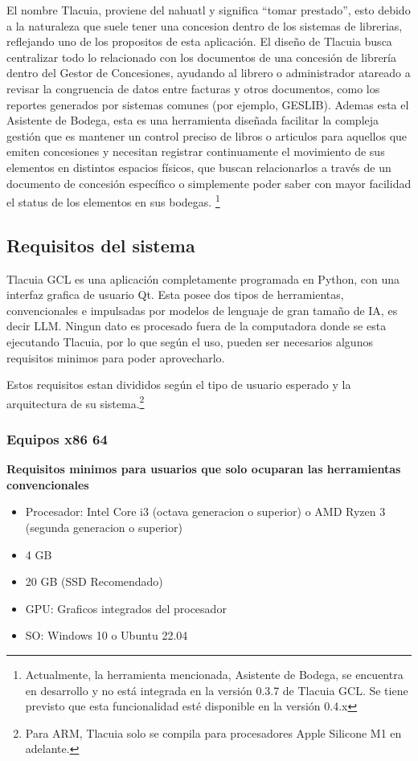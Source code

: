 \documentclass[12pt, letterpaper]{article}
\begin{document}
El nombre Tlacuia, proviene del nahuatl y significa “tomar prestado”, esto debido a la naturaleza que suele tener una concesion 
dentro de los sistemas de librerias, reflejando uno de los propositos de esta aplicación. El diseño de Tlacuia busca centralizar 
todo lo relacionado con los documentos de una concesión de librería dentro del Gestor de Concesiones, ayudando al librero o 
administrador atareado a revisar la congruencia de datos entre facturas y otros documentos, como los reportes generados por 
sistemas comunes (por ejemplo, GESLIB). Ademas esta el Asistente de Bodega, esta es una herramienta diseñada facilitar la compleja 
gestión que es mantener un control preciso de libros o articulos para aquellos que emiten concesiones y necesitan registrar 
continuamente el movimiento de sus elementos en distintos espacios físicos, que buscan relacionarlos a través de un documento 
de concesión específico o simplemente poder saber con mayor facilidad el status de los elementos en sus bodegas.  \footnote{
    Actualmente, la herramienta mencionada, Asistente de Bodega, se encuentra en desarrollo y no está integrada en la versión
    0.3.7 de Tlacuia GCL. Se tiene previsto que esta funcionalidad esté disponible en la versión 0.4.x
}


\newpage
\subsection{Requisitos del sistema}
Tlacuia GCL es una aplicación completamente programada en Python, con una interfaz grafica de usuario Qt. Esta posee dos tipos de herramientas, 
convencionales e impulsadas por modelos de lenguaje de gran tamaño de IA, es decir LLM. Ningun dato es procesado fuera de la computadora donde
se esta ejecutando Tlacuia, por lo que según el uso, pueden ser necesarios algunos requisitos minimos para poder aprovecharlo. 

Estos requisitos estan divididos según el tipo de usuario esperado y la arquitectura de su sistema.\footnote{
    Para ARM, Tlacuia solo se compila para procesadores Apple Silicone M1 en adelante. 
}

\subsubsection{Equipos x86 64}
\textbf{Requisitos minimos para usuarios que solo ocuparan las herramientas convencionales}
\begin{itemize}
    \item Procesador: Intel Core i3 (octava generacion o superior) o AMD Ryzen 3 (segunda generacion o superior)
    \item 4 GB
    \item 20 GB (SSD Recomendado)
    \item GPU: Graficos integrados del procesador
    \item SO: Windows 10 o Ubuntu 22.04
\end{itemize}
\end{document}
